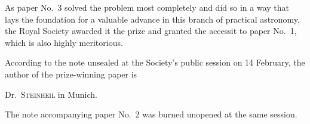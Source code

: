 As paper No.~3 solved the problem most completely and did so in a way that lays the foundation for a valuable advance in this branch of practical astronomy, the Royal Society awarded it the prize and granted the accessit to paper No.~1, which is also highly meritorious.

According to the note unsealed at the Society's public session on 14 February, the author of the prize-winning paper is

\begin{center}
Dr.\ \textsc{Steinheil} in Munich.
\end{center}

The note accompanying paper No.~2 was burned unopened at the same session.
